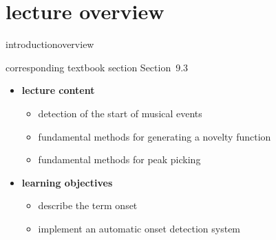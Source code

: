 


\subtitle{Module 9.3: Onset Detection}


	

    \section[overview]{lecture overview}
        \begin{frame}{introduction}{overview}
            \begin{block}{corresponding textbook section}
                    Section~9.3
            \end{block}

            \begin{itemize}
                \item   \textbf{lecture content}
                    \begin{itemize}
                        \item   detection of the start of musical events
                        \item   fundamental methods for generating a novelty function
                        \item   fundamental methods for peak picking
                    \end{itemize}
                \bigskip
                \item<2->   \textbf{learning objectives}
                    \begin{itemize}
                        \item   describe the term onset
                        \item   implement an automatic onset detection system
                    \end{itemize}
            \end{itemize}
        \end{frame}

